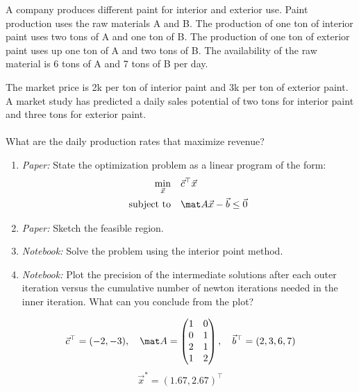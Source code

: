 \begin{exercise}[subtitle={Paper + Notebook}]
  A company produces different paint for interior and exterior use. Paint
  production uses the raw materials A and B. The production of one ton of
  interior paint uses two tons of A and one ton of B. The production of one ton
  of exterior paint uses up one ton of A and two tons of B. The availability of
  the raw material is 6 tons of A and 7 tons of B per day.

  The market price is 2k\texteuro{} per ton of interior paint and 3k\texteuro{}
  per ton of exterior paint. A market study has predicted a daily sales
  potential of two tons for interior paint and three tons for exterior paint.\\\\
  What are the daily production rates that maximize revenue?

\begin{enumerate}[label=\emph{\alph*)}]
\item \textit{Paper:} State the optimization problem as a linear program of the form:
  \begin{align*}
    \min_{\vec x} \quad & \vec{c}^{\top} \vec{x}\\
    \text{subject to} \quad & \mat A \vec{x} - \vec{b} \leq \vec{0}
  \end{align*}
\item \textit{Paper:} Sketch the feasible region.
\item \textit{Notebook:} Solve the problem using the interior point method.
\item \textit{Notebook:} Plot the precision of the intermediate solutions after each outer iteration versus the cumulative number of newton iterations needed in the inner iteration. What can you conclude from the plot?
\end{enumerate}
\end{exercise}

\begin{solution}[print=true]
  \begin{align*}
    \vec{c}^{\top} = (-2, -3), \quad
    \mat A =
    \begin{pmatrix}
      1 & 0 \\
      0  & 1\\
      2 & 1\\
      1 & 2
    \end{pmatrix}, \quad
    \vec{b}^{\top} = (2,3,6,7)
  \end{align*}
    \begin{equation*}
    \vec x^* = (1.67, 2.67)^{\top}
  \end{equation*}
\end{solution}


